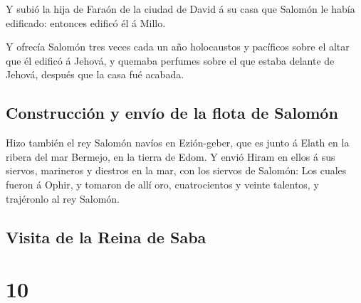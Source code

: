  Y subió la hija de Faraón de la ciudad de David á su
casa que Salomón le había edificado: entonces edificó él á Millo.

 Y ofrecía Salomón tres veces cada un año holocaustos y
pacíficos sobre el altar que él edificó á Jehová, y quemaba perfumes
sobre el que estaba delante de Jehová, después que la casa fué acabada.

\hypertarget{construcciuxf3n-y-envuxedo-de-la-flota-de-salomuxf3n}{%
\subsection{Construcción y envío de la flota de
Salomón}\label{construcciuxf3n-y-envuxedo-de-la-flota-de-salomuxf3n}}

 Hizo también el rey Salomón navíos en Ezión-geber, que
es junto á Elath en la ribera del mar Bermejo, en la tierra de Edom.
 Y envió Hiram en ellos á sus siervos, marineros y
diestros en la mar, con los siervos de Salomón:  Los
cuales fueron á Ophir, y tomaron de allí oro, cuatrocientos y veinte
talentos, y trajéronlo al rey Salomón.

\hypertarget{visita-de-la-reina-de-saba}{%
\subsection{Visita de la Reina de
Saba}\label{visita-de-la-reina-de-saba}}

\hypertarget{section-9}{%
\section{10}\label{section-9}}

